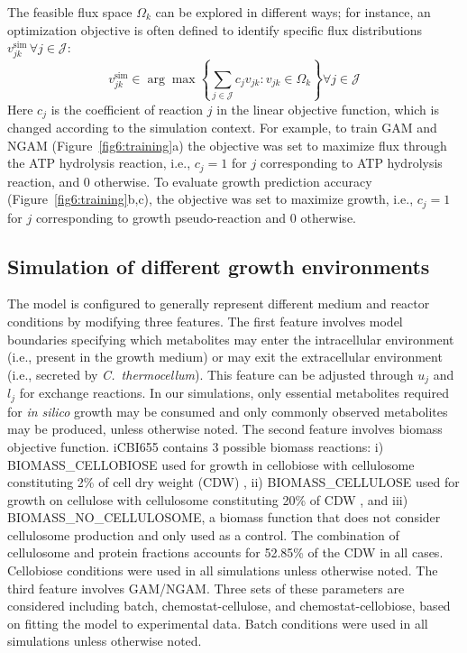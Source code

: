 The feasible flux space $\Omega_k$ can be explored in different ways;\citep{trinh2009,palsson2015} for instance, an optimization objective is often defined to identify specific flux distributions $v_{jk}^{\text{sim}}\, \forall j \in \mathcal{J}$:
\begin{equation}
    v_{jk}^{\text{sim}} \in \arg \max \left\{ \sum_{j \in \mathcal{J}} c_j v_{jk}: v_{jk} \in \Omega_k \right\}  \forall j \in \mathcal{J} \label{eq:fba}
\end{equation}
Here $c_j$ is the coefficient of reaction $j$ in the linear objective function, which is changed according to the simulation context. For example, to train GAM and NGAM (Figure~\ref{fig6:training}a) the objective was set to maximize flux through the ATP hydrolysis reaction, i.e., $c_j=1$ for $j$ corresponding to ATP hydrolysis reaction,  and 0 otherwise. To evaluate growth prediction accuracy (Figure~\ref{fig6:training}b,c), the objective was set to maximize growth, i.e., $c_j=1$ for $j$ corresponding to growth pseudo-reaction and 0 otherwise.

\subsection{Simulation of different growth environments}
The model is configured to generally represent different medium and reactor conditions by modifying three features.
The first feature involves model boundaries specifying which metabolites may enter the intracellular environment (i.e., present in the growth medium) or may exit the extracellular environment (i.e., secreted by \textit{C.~thermocellum}). This feature can be adjusted through $u_j$ and $l_j$ for exchange reactions.
In our simulations, only essential metabolites required for \textit{in silico} growth may be consumed and only commonly observed metabolites may be produced, unless otherwise noted.
The second feature involves biomass objective function. iCBI655 contains 3 possible biomass reactions: i) BIOMASS\_CELLOBIOSE used for growth in cellobiose with cellulosome constituting 2\% of cell dry weight (CDW) \citep{zhang2005}, ii) BIOMASS\_CELLULOSE used for growth on cellulose with cellulosome constituting 20\% of CDW  \citep{zhang2005}, and iii)
BIOMASS\_NO\_CELLULOSOME, a biomass function that does not consider cellulosome production and only used as a control. The combination of cellulosome and protein fractions accounts for 52.85\% of the CDW in all cases.\citep{roberts2010, thompson2015}
Cellobiose conditions were used in all simulations unless otherwise noted.
The third feature involves GAM/NGAM. Three sets of these parameters are considered including batch, chemostat-cellulose, and chemostat-cellobiose, based on fitting the model to experimental data.
Batch conditions were used in all simulations unless otherwise noted.

